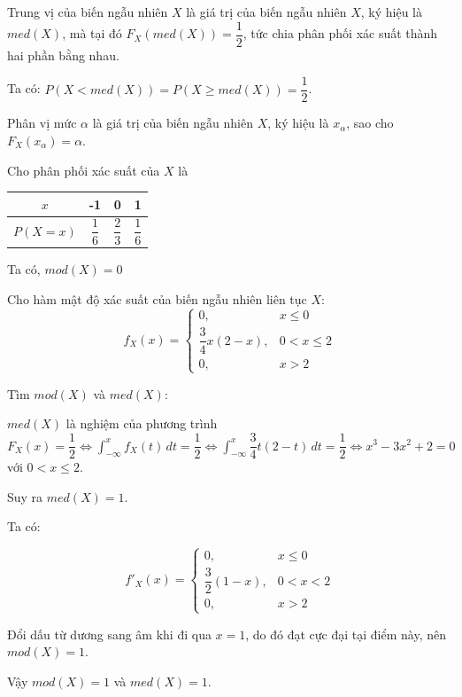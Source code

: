\documentclass[12pt,a4paper]{article}
\begin{document}
\begin{dinhnghia}[title={Trung vị}]
  Trung vị của biến ngẫu nhiên $X$ là giá trị của biến ngẫu nhiên $X$, ký hiệu là $med(X)$, mà tại đó $F_X(med(X)) = \dfrac{1}{2}$, tức chia phân phối xác suất thành hai phần bằng nhau.
  
  Ta có: $P(X < med(X)) = P(X \ge med(X)) = \dfrac{1}{2}$.
\end{dinhnghia}

\begin{dinhnghia}[title={Phân vị mức $\alpha$}]
  Phân vị mức $\alpha$ là giá trị của biến ngẫu nhiên $X$, ký hiệu là $x_\alpha$, sao cho $F_X(x_\alpha) = \alpha$.
\end{dinhnghia}

\begin{vidu}
Cho phân phối xác suất của $X$ là
  \begin{center}
    \begin{tabular}{c|ccc}
      $x$ & -1 & 0 & 1 \\
      \hline
      $P(X = x)$ & $\dfrac{1}{6}$ & $\dfrac{2}{3}$ & $\dfrac{1}{6}$ \\
    \end{tabular}
  \end{center}
  Ta có, $mod(X) = 0$
\end{vidu}

\begin{vidu}
  Cho hàm mật độ xác suất của biến ngẫu nhiên liên tục $X$:
  \[
    f_X(x) = \begin{cases} 0, & x \le 0 \\ \dfrac{3}{4} x (2 - x), & 0 < x \le 2 \\ 0, & x > 2 \end{cases}
  \]

  Tìm $mod(X)$ và $med(X)$:

  $med(X)$ là nghiệm của phương trình $F_X(x) = \dfrac{1}{2} \Leftrightarrow \displaystyle\int_{-\infty}^{x} f_X(t)\,dt = \dfrac{1}{2} \Leftrightarrow \displaystyle\int_{-\infty}^{x} \dfrac{3}{4} t (2 - t)\,dt = \dfrac{1}{2} \Leftrightarrow x^3 - 3x^2 + 2 = 0$ với $0 < x \leq 2$.
  
  Suy ra $med(X) = 1$.

  Ta có:
  
  \[
    f'_X(x) = \begin{cases} 0, & x \le 0 \\ \dfrac{3}{2} (1 - x), & 0 < x < 2 \\ 0, & x > 2 \end{cases}
  \]

  Đổi dấu từ dương sang âm khi đi qua $x = 1$, do đó đạt cực đại tại điểm này, nên $mod(X) = 1$.

  Vậy $mod(X) = 1$ và $med(X) = 1$.
\end{vidu}
\end{document}
